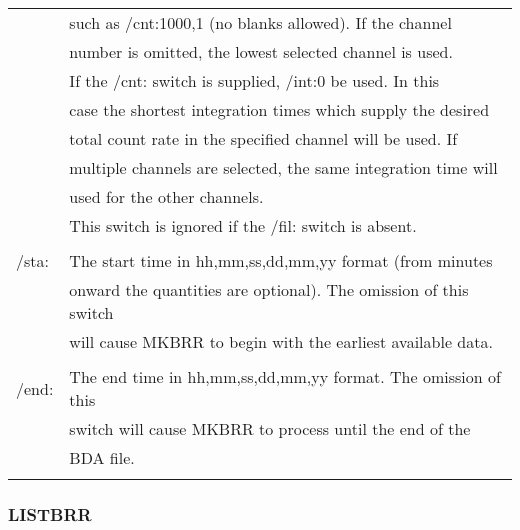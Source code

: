 \begin{center}
\begin{tabular}{|l l|}
              &  such as /cnt:1000,1 (no blanks allowed).  If the channel  \\
              &  number is omitted, the lowest selected channel is used.  \\
              &  If the /cnt: switch is supplied, /int:0 be used.  In this  \\
              &  case the shortest integration times which supply the desired  \\
              &  total count rate in the specified channel will be used.  If  \\
              &  multiple channels are selected, the same integration time will \\
              &   used for the other channels. \\
              &  This switch is ignored if the /fil: switch is absent. \\
              &  \\
	/sta: &	The start time in hh,mm,ss,dd,mm,yy format (from minutes  \\
              &  onward the quantities are optional). The omission of this switch  \\
              &  will cause MKBRR to begin with the earliest available data. \\
              &  \\
	/end: &	The end time in hh,mm,ss,dd,mm,yy format. The omission of this \\
	      &	switch will cause MKBRR to process until the end of the  \\
              &  BDA file. \\
              &  \\
\hline
\end{tabular}
\end{center}

\newpage

\subsubsection{LISTBRR}

